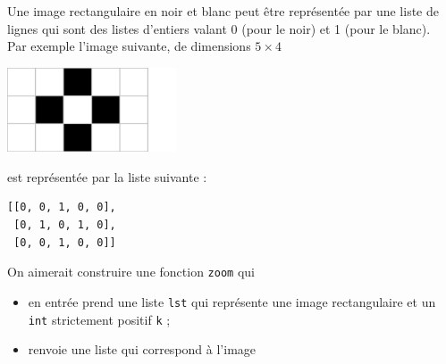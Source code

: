 \documentclass[a4paper,12pt,exos,firamath]{nsi}
\begin{document}
\maketitle

Une image rectangulaire en noir et blanc peut être représentée par une liste de lignes qui sont des listes d'entiers valant 0 (pour le noir) et 1 (pour le blanc).\\
Par exemple l'image suivante, de dimensions $5\times 4$
\begin{center}
    \includegraphics[width=5cm]{img/fig1.png}
\end{center}

est représentée par la liste suivante :
\begin{verbatim}
[[0, 0, 1, 0, 0], 
 [0, 1, 0, 1, 0],
 [0, 0, 1, 0, 0]]
\end{verbatim}

On aimerait construire une fonction \texttt{zoom} qui
\begin{itemize}
    \item en entrée prend une liste \texttt{lst} qui représente une image rectangulaire et un \texttt{int} strictement positif \texttt{k} ;
    \item renvoie une liste qui correspond à l'image   
\end{itemize} 
\end{document}
